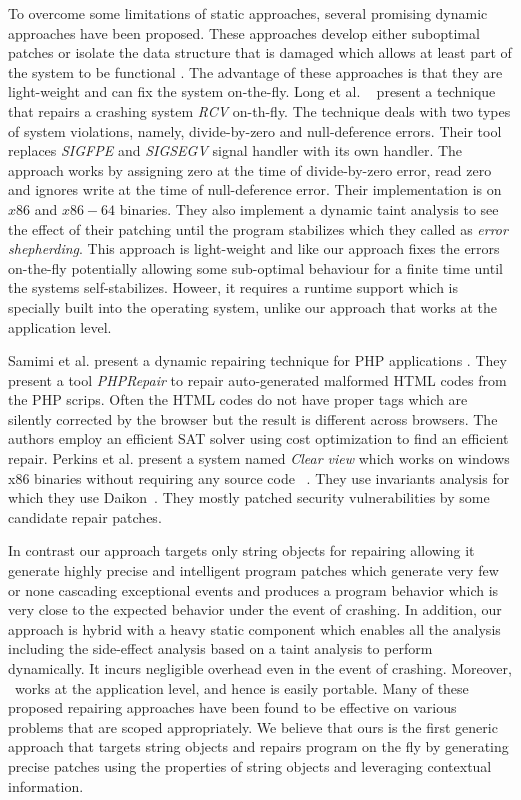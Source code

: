 To overcome some limitations of static approaches, several promising dynamic approaches have
been proposed. These approaches develop either suboptimal patches or
isolate the data structure that is damaged which allows at least part of the
system to be functional \cite{conf/issre/DemskyR03, conf/icse/DemskyR05,
conf/issta/DemskyEGMPR06}. The advantage of these approaches is that they are
light-weight and can fix the system on-the-fly. Long et al. ~\cite{conf/pldi/LongSR14}
present a technique that repairs a crashing system \emph{RCV} on-th-fly.
The technique deals with two types of system violations, namely, divide-by-zero and
null-deference errors. Their tool replaces \emph{SIGFPE} and \emph{SIGSEGV}
signal handler with its own handler. The approach works by assigning zero
at the time of divide-by-zero error, read zero and ignores write at the time of
null-deference error. Their implementation is on $x86$ and $x86-64$ binaries.
They also implement a dynamic taint analysis to see the effect of their
patching until the program stabilizes which they called as \emph{error
shepherding}.
This approach is light-weight and like our approach fixes the errors on-the-fly
potentially allowing some sub-optimal behaviour for a finite time until the
systems self-stabilizes. Howeer, it requires a runtime support which is specially
built into the operating system, unlike our approach that works at the application level.

Samimi et al. present a dynamic repairing technique for PHP applications  \cite{SamirniSAMTH12}.
They present a tool \textit{PHPRepair} to repair auto-generated
malformed HTML codes from the PHP scrips. Often the HTML codes do not have
proper tags which are silently corrected by the browser but the result is
different across browsers. The authors employ an efficient SAT solver
using cost optimization to find an efficient repair.
Perkins et al. present a system named \emph{Clear view} which works on windows x86 binaries
without requiring any source code ~\cite{conf/sosp/PerkinsKLABCPSSSWZER09}.
They use invariants analysis for which they
use Daikon~\cite{DBLP:journals/scp/ErnstPGMPTX07}. They mostly patched security
vulnerabilities by some candidate repair patches.

In contrast our approach targets only string objects for repairing allowing it
generate highly precise and intelligent program patches which generate very few or none
cascading exceptional events and produces a program behavior which is very close
to the expected behavior under the event of crashing.
In addition, our approach is hybrid with a heavy static component which enables
all the analysis including the side-effect analysis based on a taint analysis to
perform dynamically. It incurs negligible overhead even in the event of
crashing. Moreover, \tool\ works at the application level, and hence is easily portable.
Many of these proposed repairing approaches have been found to be effective on
various problems that are scoped appropriately. We believe that ours is the first
generic approach that targets string objects and repairs program on the fly by
generating precise patches using the properties of string objects and leveraging contextual
information.


